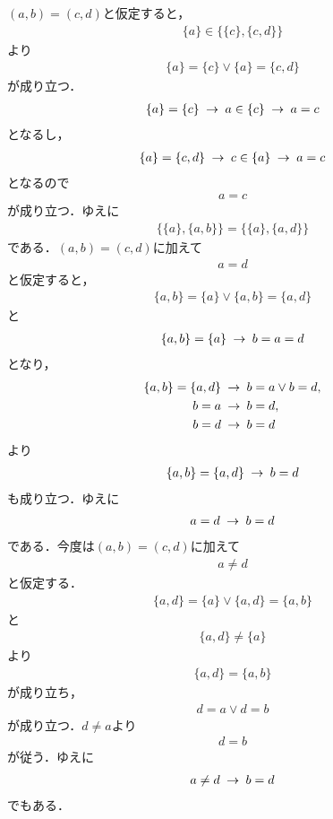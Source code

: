 	\begin{sketch}
		$(a,b) = (c,d)$と仮定すると，
		\begin{align}
			\{a\} \in \{\{c\},\{c,d\}\}
		\end{align}
		より
		\begin{align}
			\{a\} = \{c\} \vee \{a\} = \{c,d\}
		\end{align}
		が成り立つ．
		\begin{align}
			\{a\} = \{c\} \hspace{0.25em}\rightarrow\hspace{0.25em} a \in \{c\} \hspace{0.25em}\rightarrow\hspace{0.25em} a = c
		\end{align}
		となるし，
		\begin{align}
			\{a\} = \{c,d\} \hspace{0.25em}\rightarrow\hspace{0.25em} c \in \{a\} \hspace{0.25em}\rightarrow\hspace{0.25em} a = c
		\end{align}
		となるので
		\begin{align}
			a = c
		\end{align}
		が成り立つ．ゆえに
		\begin{align}
			\{\{a\},\{a,b\}\} = \{\{a\},\{a,d\}\}
		\end{align}
		である．$(a,b) = (c,d)$に加えて
		\begin{align}
			a = d
		\end{align}
		と仮定すると，
		\begin{align}
			\{a,b\} = \{a\} \vee \{a,b\} = \{a,d\}
		\end{align}
		と
		\begin{align}
			\{a,b\} = \{a\} \hspace{0.25em}\rightarrow\hspace{0.25em} b = a = d
		\end{align}
		となり，
		\begin{align}
			\{a,b\} = \{a,d\} &\hspace{0.25em}\rightarrow\hspace{0.25em} b = a \vee b = d, \\
			b = a &\hspace{0.25em}\rightarrow\hspace{0.25em} b = d, \\
			b = d &\hspace{0.25em}\rightarrow\hspace{0.25em} b = d
		\end{align}
		より
		\begin{align}
			\{a,b\} = \{a,d\} \hspace{0.25em}\rightarrow\hspace{0.25em} b = d
		\end{align}
		も成り立つ．ゆえに
		\begin{align}
			a = d \hspace{0.25em}\rightarrow\hspace{0.25em} b = d
		\end{align}
		である．今度は$(a,b) = (c,d)$に加えて
		\begin{align}
			a \neq d
		\end{align}
		と仮定する．
		\begin{align}
			\{a,d\} = \{a\} \vee \{a,d\} = \{a,b\}
		\end{align}
		と
		\begin{align}
			\{a,d\} \neq \{a\}
		\end{align}
		より
		\begin{align}
			\{a,d\} = \{a,b\}
		\end{align}
		が成り立ち，
		\begin{align}
			d = a \vee d = b
		\end{align}
		が成り立つ．$d \neq a$より
		\begin{align}
			d = b
		\end{align}
		が従う．ゆえに
		\begin{align}
			a \neq d \hspace{0.25em}\rightarrow\hspace{0.25em} b = d
		\end{align}
		でもある．
		\QED
	\end{sketch}
	
